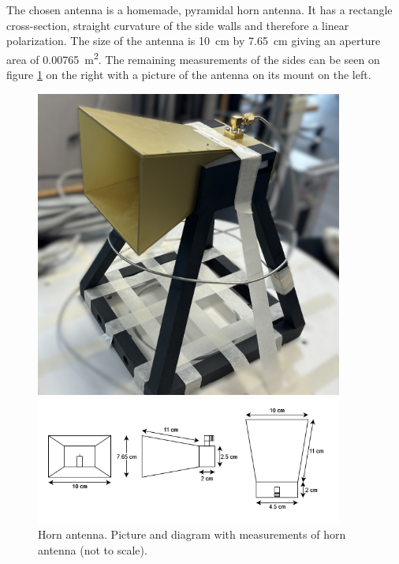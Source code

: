 The chosen antenna is a homemade, pyramidal horn antenna. It has a rectangle cross-section, straight curvature of the side walls and therefore a linear polarization. The size of the antenna is \SI{10}{\centi\meter} by \SI{7.65}{\centi\meter} giving an aperture area of \SI{0.00765}{\meter\squared}. The remaining measurements of the sides can be seen on figure \ref{fig:horn_design} on the right with a picture of the antenna on its mount on the left.

\begin{figure}[H]
    \begin{minipage}{0.35\textwidth}
        \centering
        \includegraphics[width=0.9\textwidth]{figures/IMG_2430.JPEG} %
    \end{minipage}\hfill
    \begin{minipage}{0.6\textwidth}
        \centering
        \includegraphics[width=0.9\textwidth]{figures/horn_diagram.png} %
    \end{minipage}
    \caption{Horn antenna. Picture and diagram with measurements of horn antenna (not to scale).}
    \label{fig:horn_design}
\end{figure}

